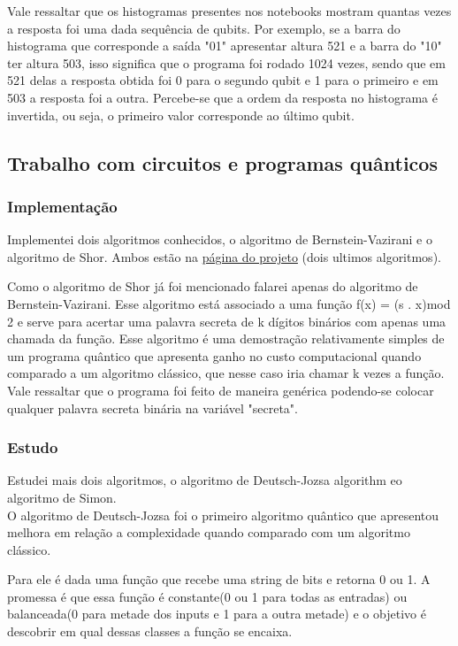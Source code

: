 \documentclass{article}
\begin{document}
        Vale ressaltar que os histogramas presentes nos notebooks mostram quantas vezes a resposta foi uma dada sequência de qubits. Por exemplo, se a barra do histograma que corresponde a saída "01" apresentar altura 521 e a barra do "10" ter altura 503, isso significa que o programa foi rodado 1024 vezes, sendo que em 521 delas a resposta obtida foi 0 para o segundo qubit e 1 para o primeiro e em 503 a resposta foi a outra. Percebe-se que a ordem da resposta no histograma é invertida, ou seja, o primeiro valor corresponde ao último qubit.

    \subsection{Trabalho com circuitos e programas quânticos}

        \subsubsection{Implementação}
        Implementei dois algoritmos conhecidos, o algoritmo de Bernstein-Vazirani e o algoritmo de Shor. Ambos estão na \href{https://interscity.org/quantum-internet/}{página do projeto} (dois ultimos algoritmos). 
    
        Como o algoritmo de Shor já foi mencionado falarei apenas do algoritmo de Bernstein-Vazirani. Esse algoritmo está associado a uma função f(x) = (s . x)mod 2 e serve para acertar uma palavra secreta de k dígitos binários com apenas uma chamada da função. Esse algoritmo é uma demostração relativamente simples de um programa quântico que apresenta ganho no custo computacional quando comparado a um algoritmo clássico, que nesse caso iria chamar k vezes a função. Vale ressaltar que o programa foi feito de maneira genérica podendo-se colocar qualquer palavra secreta binária na variável "secreta".

        \subsubsection{Estudo}
            Estudei mais dois algoritmos, o algoritmo de Deutsch-Jozsa algorithm eo algoritmo de Simon.
            \\
           
            O algoritmo de Deutsch-Jozsa foi o primeiro algoritmo quântico que apresentou melhora em relação a complexidade quando comparado com um algoritmo clássico. 
            
            Para ele é dada uma função que recebe uma string de bits e retorna 0 ou 1. A promessa é que essa função é constante(0 ou 1 para todas as entradas) ou balanceada(0 para metade dos inputs e 1 para a outra metade) e o objetivo é descobrir em qual dessas classes a função se encaixa.
            
\end{document}
